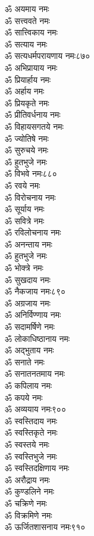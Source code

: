 \begin{center}
\begin{multicols}{2}
\begin{flushleft}
ॐ अयमाय नमः\\
ॐ सत्त्ववते नमः\\
ॐ सात्त्विकाय नमः\\
ॐ सत्याय नमः\\
ॐ सत्यधर्मपरायणाय नमः\hfill ८७०\\
ॐ अभिप्रायाय नमः\\
ॐ प्रियार्हाय नमः\\
ॐ अर्हाय नमः\\
ॐ प्रियकृते नमः\\
ॐ प्रीतिवर्धनाय नमः\\
ॐ विहायसगतये नमः\\
ॐ ज्योतिषे नमः\\
ॐ सुरुचये नमः\\
ॐ हुतभुजे नमः\\
ॐ विभवे नमः\hfill ८८०\\
ॐ रवये नमः\\
ॐ विरोचनाय नमः\\
ॐ सूर्याय नमः\\
ॐ सवित्रे नमः\\
ॐ रविलोचनाय नमः\\
ॐ अनन्ताय नमः\\
ॐ हुतभुजे नमः\\
ॐ भोक्त्रे नमः\\
ॐ सुखदाय नमः\\
ॐ नैकजाय नमः\hfill ८९०\\
ॐ अग्रजाय नमः\\
ॐ अनिर्विण्णाय नमः\\
ॐ सदामर्षिणे नमः\\
ॐ लोकाधिष्ठानाय नमः\\
ॐ अद्भुताय नमः\\
ॐ सनाते नमः\\
ॐ सनातनतमाय नमः\\
ॐ कपिलाय नमः\\
ॐ कपये नमः\\
ॐ अव्ययाय नमः\hfill ९००\\
ॐ स्वस्तिदाय नमः\\
ॐ स्वस्तिकृते नमः\\
ॐ स्वस्तये नमः\\
ॐ स्वस्तिभुजे नमः\\
ॐ स्वस्तिदक्षिणाय नमः\\
ॐ अरौद्राय नमः\\
ॐ कुण्डलिने नमः\\
ॐ चक्रिणे नमः\\
ॐ विक्रमिणे नमः\\
ॐ ऊर्जितशासनाय नमः\hfill ९१०\\

\end{flushleft}
\end{multicols}
\end{center}
